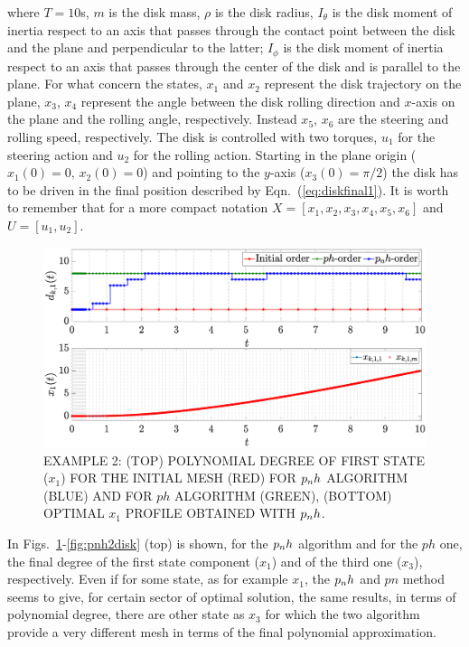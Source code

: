 where $T = 10$s, $m$ is the disk mass, $\rho$ is the disk radius, $I_{\theta}$ is the disk moment of inertia respect to an axis that passes through the contact point between the disk and the plane and perpendicular to the latter; $I_{\phi}$ is the disk moment of inertia respect to an axis that passes through the center of the disk and is parallel to the plane.
For what concern the states, $x_1$ and $x_2$ represent the disk trajectory on the plane, $x_3$, $x_4$ represent the angle between the disk rolling direction and $x$-axis on the plane and the rolling angle, respectively. Instead $x_5$, $x_6$ are the steering and rolling speed, respectively.
The disk is controlled with two torques, $u_1$ for the steering action and $u_2$ for the rolling action. Starting in the plane origin ($x_1(0) = 0, \, x_2(0) = 0$) and pointing to the $y$-axis ($x_3(0) = \pi/2$) the disk has to be driven in the final position described by
Eqn.~(\ref{eq:diskfinal1}). It is worth to remember that for a more compact notation $X = [x_1, x_2, x_3, x_4, x_5, x_6]$  and $U = [u_1, u_2]$.
\begin{figure}[t]
	\centering
	\includegraphics[trim={1cm 0cm 2cm 0cm},clip,width=1\columnwidth]{Img/pnh1_disk1}
	\caption{EXAMPLE 2: (TOP) POLYNOMIAL DEGREE OF FIRST STATE ($x_{1}$) FOR THE INITIAL MESH (RED) FOR $p_{n}h$ ALGORITHM (BLUE) AND FOR $ph$ ALGORITHM (GREEN), (BOTTOM)
		OPTIMAL $x_1$ PROFILE OBTAINED WITH $p_{n}h$.}
	\label{fig:pnh1disk}
\end{figure}
In Figs.~\ref{fig:pnh1disk}-\ref{fig:pnh2disk} (top) is shown, for the $p_{n}h$ algorithm and for the $ph$ one, the final degree of the first state component ($x_1$) and of the third one ($x_3$), respectively. Even if for some state, as for example $x_1$, the $p_{n}h$ and $pn$ method seems to give, for certain sector of optimal solution, the same results, in terms of polynomial degree, there are other state as $x_3$ for which the two algorithm provide a very different mesh in terms of the final polynomial approximation.
